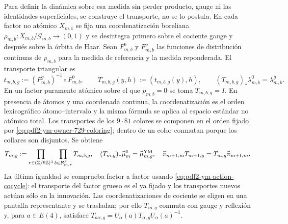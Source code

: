 Para definir la dinámica sobre esa medida sin perder producto, gauge ni las
identidades superficiales, se construye el transporte, no se lo postula. En cada
factor no atómico $X_{m,b}$ se fija una coordenatización boreliana
$\rho_{m,b}:X_{m,b}/\mathcal G_{m,b}\to(0,1)$ y se desintegra primero sobre el
cociente gauge y después sobre la órbita de Haar. Sean $F_{m,b}^0$ y
$F_{m,b}^g$ las funciones de distribución continuas de $\rho_{m,b}$ para la
medida de referencia y la medida reponderada. El transporte triangular es
\begin{equation}\label{eq:pdf2-ym-gibbs-transport-factor}
 t_{m,b,g}:=(F_{m,b}^g)^{-1}\circ F_{m,b}^0,
 \qquad
 T_{m,b,g}(y,h):=(t_{m,b,g}(y),h),
 \qquad
 (T_{m,b,g})_*\lambda_{m,b}^0=\lambda_{m,b}^g.
\end{equation}
En un factor puramente atómico sobre el que $p_{m,b}=0$ se toma
$T_{m,b,g}=I$. En presencia de átomos y una coordenada continua, la coordenatización es el
orden lexicográfico átomo--intervalo y la misma fórmula se aplica al espacio
estándar no atómico total. Los transportes de los $9\cdot81$ colores se componen
en el orden fijado por \eqref{eq:pdf2-ym-owner-729-coloring}; dentro de un color
conmutan porque los collares son disjuntos. Se obtiene
\begin{equation}\label{eq:pdf2-ym-gibbs-transport-global}
 T_{m,g}:=\prod_{r\in(\mathbb Z/9\mathbb Z)^3}
           \prod_{b\in\mathcal B_{m,r}^{F}}T_{m,b,g},
 \quad
 (T_{m,g})_*\widehat\mu_m^0=\widehat\mu_{m,g}^{\rm YM},
 \quad
 \widehat\pi_{m+1,m}T_{m+1,g}=T_{m,g}\widehat\pi_{m+1,m}.
\end{equation}
La última igualdad se comprueba factor a factor usando
\eqref{eq:pdf2-ym-action-cocycle}: el transporte del factor grueso es el ya fijado y
los transportes nuevos actúan sólo en la innovación. Las coordenatizaciones de cociente se
eligen en una pantalla representante y se trasladan; por ello $T_{m,g}$ conmuta con
gauge y reflexión y, para $a\in E(4)$, satisface
$T_{a\alpha,g}=U_\alpha(a)T_{\alpha,g}U_\alpha(a)^{-1}$.

